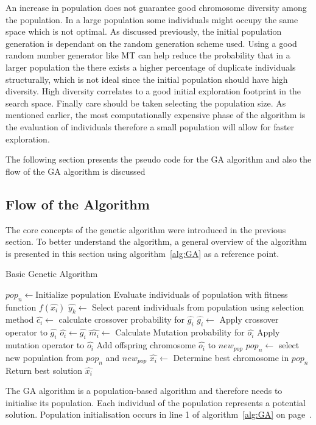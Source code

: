 An increase in population does not guarantee good chromosome diversity among the population. In a large population some individuals might occupy the same space which is not optimal. As discussed previously, the initial population generation is dependant on the random generation scheme used. Using a good random number generator like \gls{MT} can help reduce the probability that in a larger population the there exists a higher percentage of duplicate individuals structurally, which is not ideal since the initial population should have high diversity. High diversity correlates to a good initial exploration footprint in the search space. Finally care should be taken selecting the population size. As mentioned earlier, the most computationally expensive phase of the algorithm is the evaluation of individuals therefore a small population will allow for faster exploration.


The following section presents the pseudo code for the \gls{GA} algorithm and also the flow of the \gls{GA} algorithm is discussed
\subsection{Flow of the Algorithm}
The core concepts of the genetic algorithm were introduced in the previous section. To better understand the algorithm, a general overview of the algorithm is presented in this section using algorithm~\ref{alg:GA} as a reference point.
\begin{algorithm}[H]
\caption{Basic Genetic Algorithm\cite{GAGoldberg, CompuIntelligenceIntro}}
\label{alg:GA}
	\begin{algorithmic}[1]
		\State $pop_n\leftarrow$Initialize population
    \State Evaluate individuals of population with fitness function $f(\hat{x_i})$
    \State $\hat{y_k} \leftarrow$ Select parent individuals from population using selection method
		\Repeat
    \State $\hat{c_i} \leftarrow$ calculate crossover probability for $\hat{g_i}$
    \State $\hat{g_i} \leftarrow$ Apply crossover operator to $\hat{g_i}$
    \EndIf
        \State $\hat{o_i} \leftarrow \hat{g_i}$
        \State $\hat{m_i}\leftarrow$ Calculate Mutation probability for $\hat{o_i}$
        \State Apply mutation operator to $\hat{o_i}$
				\EndIf
        \State Add offspring chromosome $\hat{o_i}$ to $new_{pop}$
			\EndFor
		\State $pop_n \leftarrow$ select new population from $pop_n$ and $new_{pop}$
		\EndWhile
    \State $\hat{x_i} \leftarrow$ Determine best chromosome in $pop_n$
    \State Return best solution $\hat{x_i}$
	\end{algorithmic}
\end{algorithm}
The \gls{GA} algorithm is a population-based algorithm and therefore needs to initialise its population. Each individual of the population represents a potential solution. Population initialisation occurs in line 1 of algorithm~\ref{alg:GA} on page~\pageref{alg:GA}. 

